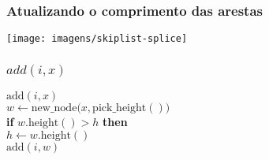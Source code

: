 \documentclass{beamer}
\begin{document}
\begin{frame}
\frametitle{Atualizando o comprimento das arestas}
\texttt{[image: imagens/skiplist-splice]}
\end{frame}

\begin{frame}
\frametitle{$add(i,x)$}
\begin{oframed}
\begin{flushleft}
\hspace*{1em} \ensuremath{\mathrm{add}(\ensuremath{\mathit{i}}, \ensuremath{\mathit{x}})}\\

\hspace*{1em} \hspace*{1em} \ensuremath{\ensuremath{\mathit{w}} \gets  \ensuremath{\mathrm{new\_node}(\ensuremath{\mathit{x}}, \mathrm{pick\_height}()})}\\
\hspace*{1em} \hspace*{1em} {\color{black} \textbf{if}} \ensuremath{\ensuremath{\mathit{w}}.\mathrm{height}() > h} {\color{black} \textbf{then}} \\
\hspace*{1em} \hspace*{1em} \hspace*{1em} \ensuremath{\ensuremath{\mathit{h}} \gets  \ensuremath{\ensuremath{\mathit{w}}.\mathrm{height}()}}\\
\hspace*{1em} \hspace*{1em} \ensuremath{\mathrm{add}(\ensuremath{\mathit{i}}, \ensuremath{\mathit{w}})}\\
\end{flushleft}
\end{oframed}
\end{frame}
\end{document}
